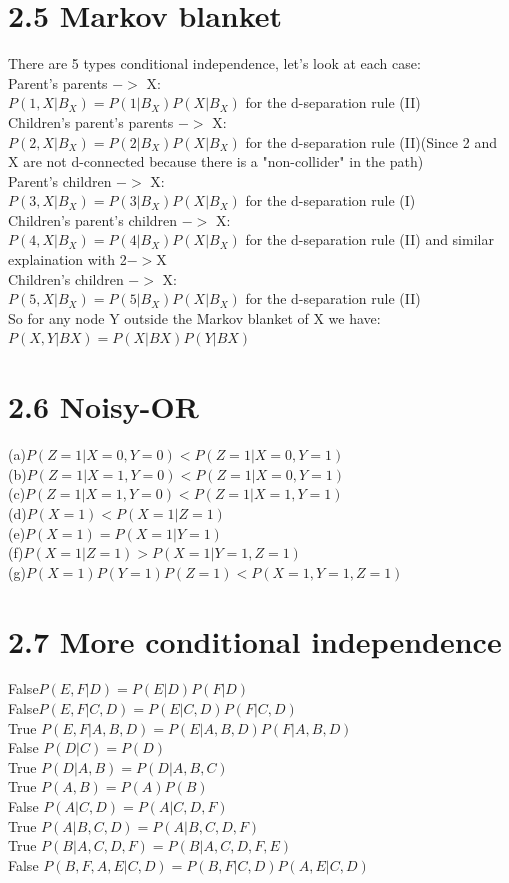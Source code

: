 \documentclass [11pt, a4paper, oneside] {article}
\begin{document}
\section *{2.5 Markov blanket}
There are 5 types conditional independence, let's look at each case:\\
Parent's parents $->$ X:\\
$P(1, X|B_X) = P(1|B_X)P(X|B_X)$ for the d-separation rule (II)\\
Children's parent's parents $->$ X:\\
$P(2, X|B_X) = P(2|B_X)P(X|B_X)$ for the d-separation rule (II)(Since 2 and X are not d-connected because there is a "non-collider" in the path)\\
Parent's children $->$ X:\\
$P(3, X|B_X) = P(3|B_X)P(X|B_X)$ for the d-separation rule (I)\\
Children's parent's children $->$ X:\\
$P(4, X|B_X) = P(4|B_X)P(X|B_X)$ for the d-separation rule (II) and similar explaination with 2$->$X\\
Children's children $->$ X:\\
$P(5, X|B_X) = P(5|B_X)P(X|B_X)$ for the d-separation rule (II)\\
So for any node Y outside the Markov blanket of X we have:\\
$P (X, Y |BX ) = P (X|BX )P (Y |BX )$\\
\section *{2.6 Noisy-OR}
(a)$P(Z=1|X=0, Y=0) < P(Z=1|X=0, Y=1)$\\
(b)$P(Z=1|X=1, Y=0) < P(Z=1|X=0, Y=1)$\\
(c)$P(Z=1|X=1, Y=0) < P(Z=1|X=1, Y=1)$\\
(d)$P(X=1) < P(X=1|Z=1)$\\
(e)$P(X=1) = P(X=1|Y=1)$\\
(f)$P(X=1|Z=1) > P(X=1|Y=1, Z=1)$\\
(g)$P(X=1)P(Y=1)P(Z=1) < P(X=1, Y=1, Z=1)$\\
\section *{2.7 More conditional independence}
False\qquad $P(E, F|D) = P(E|D)P(F|D)$ \\
False\qquad $P(E, F|C, D) = P(E|C, D)P(F|C, D)$\\
True \qquad $P(E, F|A, B, D) = P(E|A, B, D)P(F|A, B, D)$\\
False \qquad $P(D|C) = P(D)$\\
True \qquad $P(D|A,B) = P(D|A, B, C)$\\
True \qquad $P(A, B) = P(A)P(B)$\\
False \qquad $P(A|C, D) = P (A|C, D, F)$\\
True \qquad $P(A|B, C, D) = P(A|B, C, D, F)$\\
True \qquad $P(B|A, C, D, F) = P(B|A, C, D, F, E)$\\
False \qquad $P(B, F, A, E|C, D) = P(B, F|C, D)P(A, E|C, D)$\\
\end{document}
